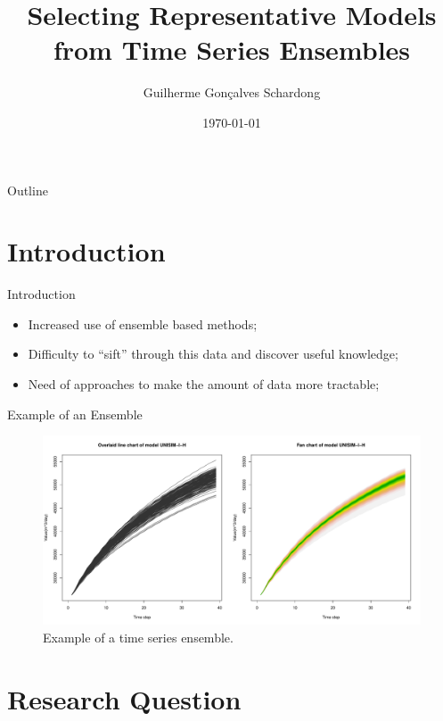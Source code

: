 \documentclass{beamer}
\title{Selecting Representative Models from Time Series Ensembles}
\author{Guilherme Gon\c{c}alves Schardong}
\date{\today}
\begin{document}
	
\begin{frame}
  \titlepage
\end{frame}

\begin{frame}{Outline}
  \tableofcontents
\end{frame}

\section{Introduction}
\begin{frame}
  \tableofcontents[currentsection]
\end{frame}

\begin{frame}{Introduction}
  \begin{itemize}
    \item Increased use of ensemble based methods;
    \item Difficulty to ``sift'' through this data and discover useful knowledge;
    \item Need of approaches to make the amount of data more tractable;
  \end{itemize}
\end{frame}

\begin{frame}{Example of an Ensemble}
  \begin{figure}
    \includegraphics[width=\columnwidth]{line-fan.pdf}
    \caption{Example of a time series ensemble.}
    \label{fig:sample}
  \end{figure}
\end{frame}

\section{Research Question}
\begin{frame}
  \tableofcontents[currentsection]
\end{frame}
\end{document}

